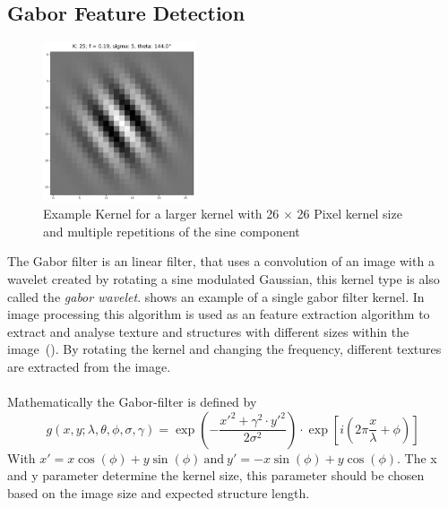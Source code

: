 \documentclass[12pt,a4paper, english,twoside]{scrartcl}
\begin{document}
  \subsection{Gabor Feature Detection}\label{sec:gabor}
    \begin{figure}
    \vspace{-1cm}
       \begin{center}
         \includegraphics[width=0.4\textwidth]{img/KLarge.png}
       \end{center}
       \caption{Example Kernel for a larger kernel with 26 $\times$ 26 Pixel kernel size and multiple repetitions of the sine component}\label{fig:largeKernel}
      \end{figure}
    The Gabor filter is an linear filter, that uses a convolution of an image with a wavelet created by rotating a sine modulated Gaussian, this kernel type is also called the \textit{gabor wavelet}. 
     shows an example of a single gabor filter kernel.
    In image processing this algorithm is used as an feature extraction algorithm to extract and analyse texture and structures with different sizes within the image~(\autocite{Cerdan1993}). 
    By rotating the kernel and changing the frequency, different textures are extracted from the image.\\ \\
    Mathematically the Gabor-filter is defined by
    \begin{equation}
      g(x,y; \lambda, \theta, \phi, \sigma, \gamma) = \exp \left(- \frac{x'^2 + \gamma^2\cdot y'^2}{2\sigma^2}\right) \cdot \exp \left[i \left(2\pi\frac{x}{\lambda} + \phi \right)\right] 
    \end{equation}
    With $ x' = x \cos(\phi) + y \sin(\phi)~\text{and}~y' = -x \sin(\phi) + y \cos(\phi)$.
    The x and y parameter determine the kernel size, this parameter should be chosen based on the image size and expected structure length.\\
\end{document}
